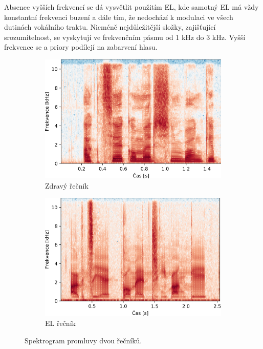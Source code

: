 Absence vyšších frekvencí se dá vysvětlit použitím EL, kde samotný EL má vždy konstantní frekvenci buzení a dále tím, že nedochází k modulaci ve všech dutinách vokálního traktu. Nicméně nejdůležitější složky, zajišťující srozumitelnost, se vyskytují ve frekvenčním pásmu od 1 kHz do 3 kHz. Vyšší frekvence se a priory podílejí na zabarvení hlasu.

\begin{figure}[htpb]
  \centering
  \begin{subfigure}[b]{0.4\textwidth}
    \includegraphics[width=\textwidth]{./ch5-construction/img/spectrogram_normal.png}
    \caption{Zdravý řečník}
    \label{fig:construction:spectrogram:normal}
  \end{subfigure}
  \begin{subfigure}[b]{0.4\textwidth}
    \includegraphics[width=\textwidth]{./ch5-construction/img/spectrogram_el.png}
    \caption{EL řečník}
    \label{fig:construction:spectrogram:el}
  \end{subfigure}
  \caption{Spektrogram promluvy  dvou řečníků.}
  \label{fig:construction:spectrogram}
\end{figure}

